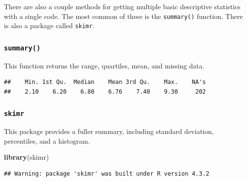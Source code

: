 \documentclass[
  b5paper]{book}
\newenvironment{Shaded}{\begin{snugshade}}{\end{snugshade}}
\newcommand{\CommentTok}[1]{\textcolor[rgb]{0.56,0.35,0.01}{\textit{#1}}}
\newcommand{\FunctionTok}[1]{\textcolor[rgb]{0.13,0.29,0.53}{\textbf{#1}}}
\newcommand{\NormalTok}[1]{#1}
\newcommand{\SpecialCharTok}[1]{\textcolor[rgb]{0.81,0.36,0.00}{\textbf{#1}}}
\begin{document}
There are also a couple methods for getting multiple basic descriptive statistics with a single code. The most common of these is the \texttt{summary()} function. There is also a package called \texttt{skimr}.

\hypertarget{summary-1}{%
\subsubsection*{\texorpdfstring{\texttt{summary()}}{summary()}}\label{summary-1}}

This function returns the range, quartiles, mean, and missing data.

\begin{Shaded}
\end{Shaded}

\begin{verbatim}
##    Min. 1st Qu.  Median    Mean 3rd Qu.    Max.    NA's 
##    2.10    6.20    6.80    6.76    7.40    9.30     202
\end{verbatim}

\hypertarget{skimr}{%
\subsubsection*{\texorpdfstring{\texttt{skimr}}{skimr}}\label{skimr}}

This package provides a fuller summary, including standard deviation, percentiles, and a histogram.

\begin{Shaded}
\begin{Highlighting}[]
\FunctionTok{library}\NormalTok{(skimr)}
\end{Highlighting}
\end{Shaded}

\begin{verbatim}
## Warning: package 'skimr' was built under R version 4.3.2
\end{verbatim}

\begin{Shaded}
\end{Shaded}
\end{document}
